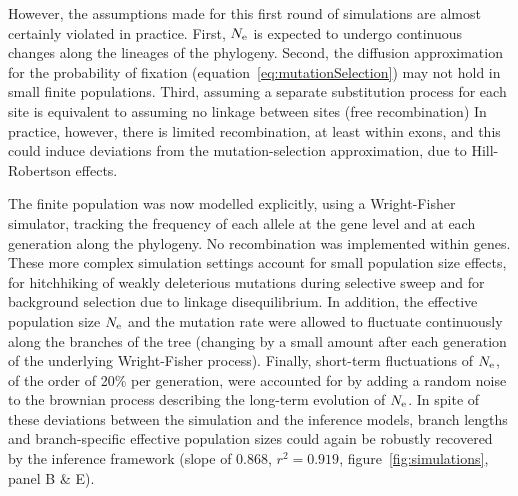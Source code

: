 \documentclass{MBE}
\begin{document}
	However, the assumptions made for this first round of simulations are almost certainly violated in practice.
	First, $N_{\text{e}}$ is expected to undergo continuous changes along the lineages of the phylogeny.
	Second, the diffusion approximation for the probability of fixation (equation~\ref{eq:mutationSelection}) may not hold in small finite populations.
	Third, assuming a separate {substitution} process for each site is equivalent to assuming no linkage between sites (free recombination)
	In practice, however, there is limited {recombination}, at least within exons, and this could induce deviations from the mutation-selection approximation, due to Hill-Robertson effects.

	The finite population was now modelled explicitly, using a Wright-Fisher simulator, tracking the frequency of each {allele} at the gene level and at each generation along the phylogeny.
	No {recombination} was implemented within genes.
	These more complex simulation settings account for small population size effects, for hitchhiking of weakly deleterious mutations during selective sweep and for background selection due to linkage disequilibrium.
	In addition, the {effective population size} $N_{\text{e}}$ and the mutation rate were allowed to fluctuate continuously along the branches of the tree (changing by a small amount after each generation of the underlying Wright-Fisher process).
	Finally, short-term fluctuations of $N_{\text{e}}$, of the order of 20\% per generation, were accounted for by adding a random noise to the brownian process describing the long-term evolution of $N_{\text{e}}$.
	In spite of these deviations between the simulation and the inference models, branch lengths and branch-specific {effective population sizes} could again be robustly recovered by the inference framework (slope of $0.868$, $r^2=0.919$, figure~\ref{fig:simulations}, panel B \& E).
\end{document}
